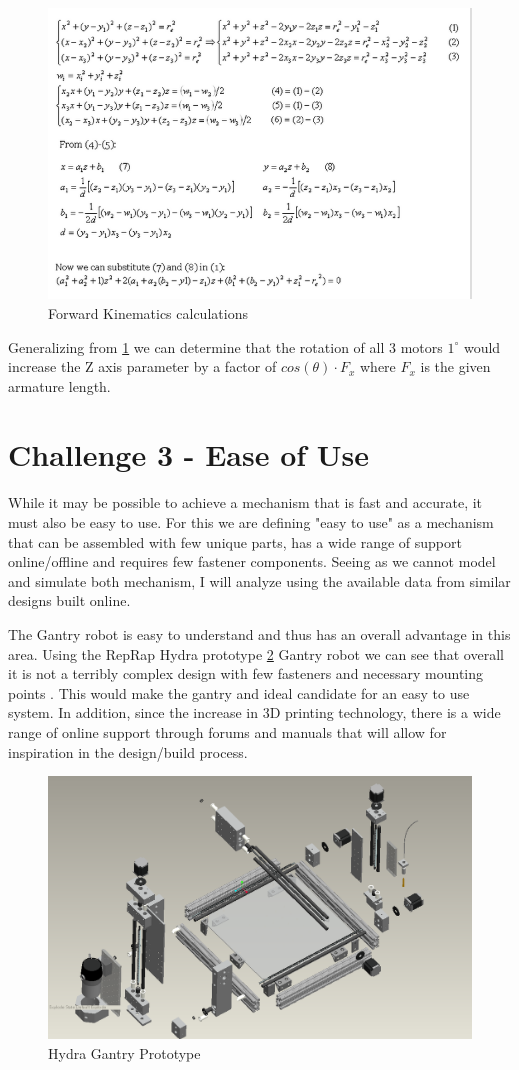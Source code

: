 \documentclass[11pt]{article}
\begin{document}
    \begin{figure}[H]
        \centering
        \includegraphics[width = .5\textwidth]{Delta_Math.png}
        \caption{Forward Kinematics calculations}
        \label{fig:forward_kin}
    \end{figure}
    
Generalizing from \ref{fig:forward_kin} we can determine that the rotation of all 3 motors $1^\circ$ would increase the Z axis parameter by a factor of $cos(\theta) \cdot F_x$ where $F_x$ is the given armature length. 

\section{Challenge 3 - Ease of Use}

While it may be possible to achieve a mechanism that is fast and accurate, it must also be easy to use. For this we are defining "easy to use" as a mechanism that can be assembled with few unique parts, has a wide range of support online/offline and requires few fastener components. Seeing as we cannot model and simulate both mechanism, I will analyze using the available data from similar designs built online.  

The Gantry robot is easy to understand and thus has an overall advantage in this area. Using the RepRap Hydra prototype \ref{fig:Hail_Hydra} Gantry robot we can see that overall it is not a terribly complex design with few fasteners and necessary mounting points \cite{Gantry_Exploded}.  This would make the gantry and ideal candidate for an easy to use system. In addition, since the increase in 3D printing technology, there is a wide range of online support through forums and manuals that will allow for inspiration in the design/build process. 

    \begin{figure}[H]
        \centering
        \includegraphics[width = .5\textwidth]{Hydra_Exploded_view2.png}
        \caption{Hydra Gantry Prototype}
        \label{fig:Hail_Hydra}
    \end{figure}
    
\end{document}
